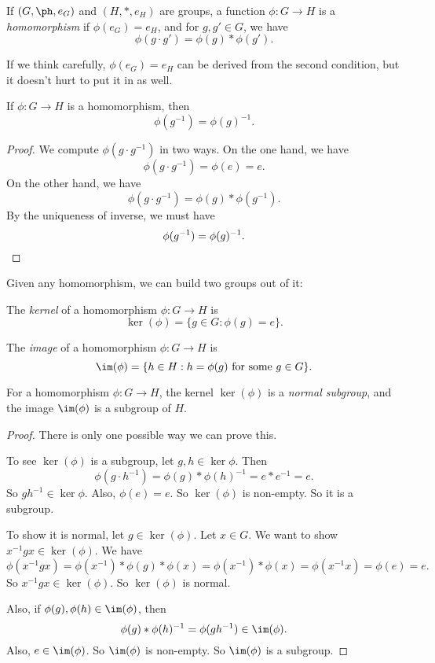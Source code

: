 \documentclass[a4paper]{article}
\begin{document}
\begin{defi}[Homomorphism]
  If $(G, \ph, e_G)$ and $(H, *, e_H)$ are groups, a function $\phi: G\to H$ is a \emph{homomorphism} if $\phi(e_G) = e_H$, and for $g, g' \in G$, we have
  \[
    \phi(g \cdot g') = \phi(g) * \phi(g').
  \]
\end{defi}
If we think carefully, $\phi(e_G) = e_H$ can be derived from the second condition, but it doesn't hurt to put it in as well.

\begin{lemma}
  If $\phi: G \to H$ is a homomorphism, then
  \[
    \phi(g^{-1}) = \phi(g)^{-1}.
  \]
\end{lemma}

\begin{proof}
  We compute $\phi(g\cdot g^{-1})$ in two ways. On the one hand, we have
  \[
    \phi(g\cdot g^{-1}) = \phi(e) = e.
  \]
  On the other hand, we have
  \[
    \phi(g\cdot g^{-1}) = \phi(g) * \phi(g^{-1}).
  \]
  By the uniqueness of inverse, we must have
  \[
    \phi(g^{-1}) = \phi(g)^{-1}. \qedhere
  \]
\end{proof}

Given any homomorphism, we can build two groups out of it:
\begin{defi}[Kernel]
  The \emph{kernel} of a homomorphism $\phi: G \to H$ is
  \[
    \ker(\phi) = \{g \in G: \phi(g) = e\}.
  \]
\end{defi}

\begin{defi}[Image]
  The \emph{image} of a homomorphism $\phi: G \to H$ is
  \[
    \im (\phi) = \{h\in H: h = \phi(g) \text{ for some }g \in G\}.
  \]
\end{defi}

\begin{lemma}
  For a homomorphism $\phi: G\to H$, the kernel $\ker (\phi)$ is a \emph{normal subgroup}, and the image $\im (\phi)$ is a subgroup of $H$.
\end{lemma}

\begin{proof}
  There is only one possible way we can prove this.

  To see $\ker(\phi)$ is a subgroup, let $g, h \in \ker \phi$. Then
  \[
    \phi(g\cdot h^{-1}) = \phi(g) * \phi(h)^{-1} = e * e^{-1} = e.
  \]
  So $gh^{-1} \in \ker \phi$. Also, $\phi(e) = e$. So $\ker(\phi)$ is non-empty. So it is a subgroup.

  To show it is normal, let $g \in \ker(\phi)$. Let $x \in G$. We want to show $x^{-1}gx \in \ker(\phi)$. We have
  \[
    \phi(x^{-1} gx) = \phi(x^{-1}) * \phi(g) * \phi(x) = \phi(x^{-1}) * \phi(x) = \phi(x^{-1}x) = \phi(e) = e.
  \]
  So $x^{-1}gx \in \ker(\phi)$. So $\ker(\phi)$ is normal.

  Also, if $\phi(g), \phi(h) \in \im (\phi)$, then
  \[
    \phi(g) * \phi(h)^{-1} = \phi(gh^{-1}) \in \im (\phi).
  \]
  Also, $e \in \im(\phi)$. So $\im(\phi)$ is non-empty. So $\im(\phi)$ is a subgroup.
\end{proof}
\end{document}
